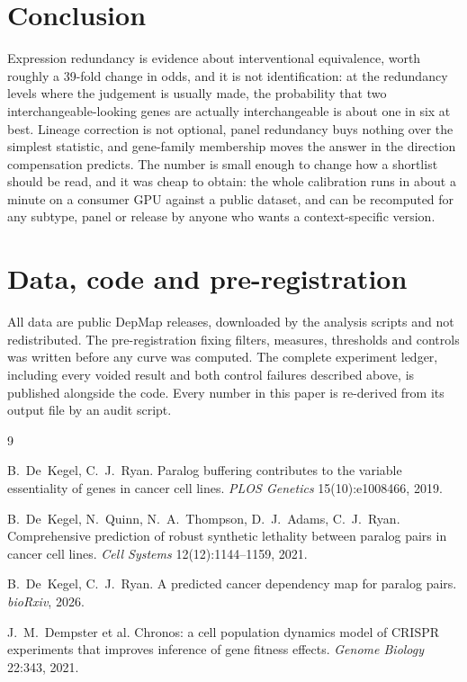 \documentclass[11pt]{article}
\begin{document}
\section{Conclusion}

Expression redundancy is evidence about interventional equivalence, worth
roughly a 39-fold change in odds, and it is not identification: at the
redundancy levels where the judgement is usually made, the probability that
two interchangeable-looking genes are actually interchangeable is about one
in six at best. Lineage correction is not optional, panel redundancy buys
nothing over the simplest statistic, and gene-family membership moves the
answer in the direction compensation predicts. The number is small enough to
change how a shortlist should be read, and it was cheap to obtain: the whole
calibration runs in about a minute on a consumer GPU against a public
dataset, and can be recomputed for any subtype, panel or release by anyone
who wants a context-specific version.

\section*{Data, code and pre-registration}

All data are public DepMap releases, downloaded by the analysis scripts and
not redistributed. The pre-registration fixing filters, measures, thresholds
and controls was written before any curve was computed. The complete
experiment ledger, including every voided result and both control failures
described above, is published alongside the code. Every number in this paper
is re-derived from its output file by an audit script.

\begin{thebibliography}{9}

 B.~De~Kegel, C.~J.~Ryan.
Paralog buffering contributes to the variable essentiality of genes in
cancer cell lines. \emph{PLOS Genetics} 15(10):e1008466, 2019.

 B.~De~Kegel, N.~Quinn, N.~A.~Thompson, D.~J.~Adams,
C.~J.~Ryan. Comprehensive prediction of robust synthetic lethality between
paralog pairs in cancer cell lines. \emph{Cell Systems} 12(12):1144--1159,
2021.

 B.~De~Kegel, C.~J.~Ryan.
A predicted cancer dependency map for paralog pairs. \emph{bioRxiv}, 2026.

 J.~M.~Dempster et al.
Chronos: a cell population dynamics model of CRISPR experiments that
improves inference of gene fitness effects.
\emph{Genome Biology} 22:343, 2021.

\end{thebibliography}
\end{document}
